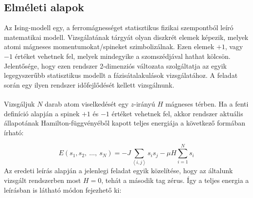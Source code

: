 \subsection{Elméleti alapok}
Az Ising-modell egy, a ferromágnességet statisztikus fizikai szempontból leíró matematikai modell. Vizsgálatának tárgyát olyan diszkrét elemek képezik, melyek atomi mágneses momentumokat/spineket szimbolizálnak. Ezen elemek $+1$, vagy $-1$ értéket vehetnek fel, melyek mindegyike a szomszédjával hathat kölcsön. Jelentősége, hogy ezen rendszer 2-dimenziós változata szolgáltatja az egyik legegyszerűbb statisztikus modellt a fázisátalakulások vizsgálatához. A feladat során egy ilyen rendszer időfejlődését kellett vizsgálnunk.
\\ \\
Vizsgáljuk $N$ darab atom viselkedését egy $z$-irányú $H$ mágneses térben. Ha a fenti definíció alapján a spinek $+1$ és $-1$ értéket vehetnek fel, akkor rendszer aktuális állapotának Hamilton-függvényéből kapott teljes energiája a következő formában írható:

\begin{equation} \label{eq:1}
    E \left( s_{1}, s_{2},\ \dots,\ s_{N} \right)
    =
    - J \sum_{\left< i,j \right>} s_{i} s_{j}
    -
    \mu H \sum_{i = 1}^{N} s_{i}
\end{equation}
Az eredeti leírás alapján a jelenlegi feladat egyik közelítése, hogy az általunk vizsgált rendszerben most $H = 0$, tehát a második tag zérus. Így a teljes energia a leírásban is látható módon fejezhető ki:


